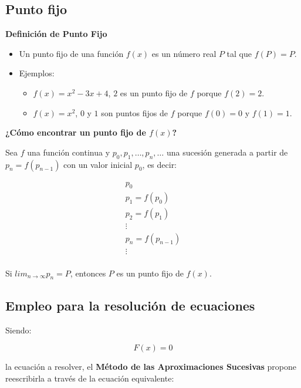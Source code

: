 \documentclass[openany]{book}
\providecommand{\tightlist}{%
  \setlength{\itemsep}{0pt}\setlength{\parskip}{0pt}}
\begin{document}
\hypertarget{punto-fijo}{%
\subsection{Punto fijo}\label{punto-fijo}}

\textbf{Definición de Punto Fijo}

\begin{itemize}
\item
  Un punto fijo de una función \(f(x)\) es un número real \(P\) tal que \(f(P)=P\).
\item
  Ejemplos:

  \begin{itemize}
  \tightlist
  \item
    \(f(x)=x^{2}-3x+4\), \(2\) es un punto fijo de \(f\) porque \(f(2) = 2\).
  \item
    \(f(x)=x^{2}\), \(0\) y \(1\) son puntos fijos de \(f\) porque \(f(0) = 0\) y \(f(1) = 1\).
  \end{itemize}
\end{itemize}

\textbf{¿Cómo encontrar un punto fijo de \(f(x)\)?}

Sea \(f\) una función continua y \(p_0, p_1, \dots, p_n, \dots\) una sucesión generada a partir de \(p_{n} = f(p_{n-1})\) con un valor inicial \(p_0\), es decir:

\begin{gather*}
p_0 \\
p_1 = f(p_0) \\
p_2 = f(p_1) \\
\vdots \\
p_n = f(p_{n-1}) \\
\vdots \\
\end{gather*}

Si \(lim_{n\to\infty} p_n = P\), entonces \(P\) es un punto fijo de \(f(x)\).

\hypertarget{empleo-para-la-resoluciuxf3n-de-ecuaciones}{%
\subsection{Empleo para la resolución de ecuaciones}\label{empleo-para-la-resoluciuxf3n-de-ecuaciones}}

Siendo:

\begin{equation}
\label{eq:a}
F(x) = 0
\end{equation}

la ecuación a resolver, el \textbf{Método de las Aproximaciones Sucesivas} propone reescribirla a través de la ecuación equivalente:
\end{document}
